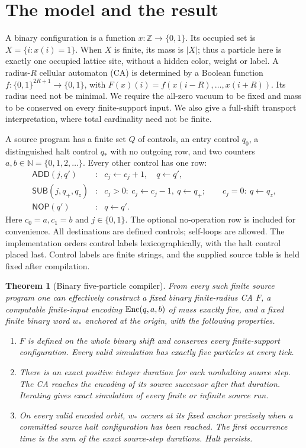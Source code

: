 \documentclass[11pt,a4paper]{article}
\numberwithin{equation}{section}
\newtheorem{theorem}{Theorem}[section]
\newcommand{\N}{\mathbb N}\newcommand{\Z}{\mathbb Z}\newcommand{\R}{\mathbb R}
\newcommand{\ADD}{\mathsf{ADD}}\newcommand{\SUB}{\mathsf{SUB}}\newcommand{\NOP}{\mathsf{NOP}}\newcommand{\HALT}{\mathsf{HALT}}
\begin{document}
\section{The model and the result}\label{fpa:rep:14:first}
A binary configuration is a function $x:\Z\to\{0,1\}$. Its occupied set is
$X=\{i:x(i)=1\}$. When $X$ is finite, its mass is $|X|$; thus a particle here
is exactly one occupied lattice site, without a hidden color, weight or label.
A radius-$R$ cellular automaton (CA) is determined by a Boolean function
$f:\{0,1\}^{2R+1}\to\{0,1\}$, with
$F(x)(i)=f(x(i-R),\ldots,x(i+R))$. Its radius need not be minimal.
We require the all-zero vacuum to be fixed and mass to be conserved on every
finite-support input. We also give a full-shift transport interpretation,
where total cardinality need not be finite.

A source program has a finite set $Q$ of controls, an entry control $q_0$, a
distinguished halt control $q_*$ with no outgoing row, and two counters
$a,b\in\N=\{0,1,2,\ldots\}$. Every other control has one row:
\[
\begin{array}{lll}
\ADD(j,q') &: & c_j\gets c_j+1,\quad q\gets q',\\
\SUB(j,q_+,q_z) &: &
  c_j>0:\ c_j\gets c_j-1,\ q\gets q_+;\qquad
  c_j=0:\ q\gets q_z,\\
\NOP(q') &: & q\gets q'.
\end{array}
\]
Here $c_0=a,c_1=b$ and $j\in\{0,1\}$. The optional no-operation row is
included for convenience. All destinations are defined controls; self-loops
are allowed. The implementation orders control labels lexicographically,
with the halt control placed last. Control labels are finite strings, and
the supplied source table is held fixed after compilation.

\begin{theorem}[Binary five-particle compiler]\label{fpa:bc:thm:compiler}
From every such finite source program one can effectively construct a fixed
binary finite-radius CA $F$, a computable finite-input encoding
$\operatorname{Enc}(q,a,b)$ of mass exactly five, and a fixed finite binary word $w_*$ anchored
at the origin, with the following properties.
\begin{enumerate}
\item $F$ is defined on the whole binary shift and conserves every finite-support
configuration. Every valid simulation has exactly five particles at every tick.
\item There is an exact positive integer duration for each nonhalting source
step. The CA reaches the encoding of its source successor after that duration.
Iterating gives exact simulation of every finite or infinite source run.
\item On every valid encoded orbit, $w_*$ occurs at its fixed anchor precisely
when a committed source halt configuration has been reached. The first
occurrence time is the sum of the exact source-step durations. Halt persists.
\end{enumerate}
\end{theorem}
\end{document}
